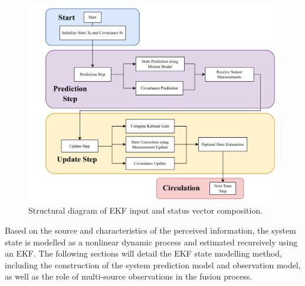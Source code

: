 \documentclass[12pt,a4paper]{article}
\numberwithin{equation}{section}
\begin{document}
\begin{figure}[H]
    \centering
    \includegraphics[width=0.85\linewidth]{images/2.jpg}
    \caption{Structural diagram of EKF input and status vector composition.}
    \label{fig:Structural diagram of EKF input and status vector composition}
\end{figure}
\noindent Based on the source and characteristics of the perceived information, the system state is modelled as a nonlinear dynamic process and estimated recursively using an EKF. The following sections will detail the EKF state modelling method, including the construction of the system prediction model and observation model, as well as the role of multi-source observations in the fusion process.
\end{document}
